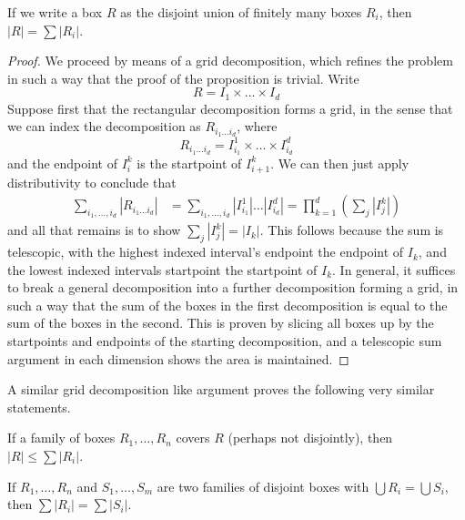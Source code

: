 \begin{lemma}
    If we write a box $R$ as the disjoint union of finitely many boxes $R_i$, then $|R| = \sum |R_i|$.
\end{lemma}
\begin{proof}
    We proceed by means of a grid decomposition, which refines the problem in such a way that the proof of the proposition is trivial. Write
    \[ R = I_1 \times \dots \times I_d \]
    Suppose first that the rectangular decomposition forms a grid, in the sense that we can index the decomposition as $R_{i_1 \dots i_d}$, where
    \[ R_{i_1 \dots i_d} = I^1_{i_1} \times \dots \times I^d_{i_d} \]
    and the endpoint of $I^k_i$ is the startpoint of $I^k_{i+1}$. We can then just apply distributivity to conclude that
    \begin{align*}
        \sum_{i_1, \dots, i_d} |R_{i_1 \dots i_d}| &= \sum_{i_1, \dots, i_d} |I^1_{i_1}| \dots |I^d_{i_d}| = \prod_{k = 1}^d \left( \sum_j |I^k_j| \right)
    \end{align*}
    and all that remains is to show $\sum_j |I^k_j| = |I_k|$. This follows because the sum is telescopic, with the highest indexed interval's endpoint the endpoint of $I_k$, and the lowest indexed intervals startpoint the startpoint of $I_k$. In general, it suffices to break a general decomposition into a further decomposition forming a grid, in such a way that the sum of the boxes in the first decomposition is equal to the sum of the boxes in the second. This is proven by slicing all boxes up by the startpoints and endpoints of the starting decomposition, and a telescopic sum argument in each dimension shows the area is maintained.
\end{proof}

A similar grid decomposition like argument proves the following very similar statements.

\begin{lemma}
    If a family of boxes $R_1, \dots, R_n$ covers $R$ (perhaps not disjointly), then $|R| \leq \sum |R_i|$.
\end{lemma}

\begin{lemma}
    If $R_1, \dots, R_n$ and $S_1, \dots, S_m$ are two families of disjoint boxes with $\bigcup R_i = \bigcup S_i$, then $\sum |R_i| = \sum |S_i|$.
\end{lemma}

